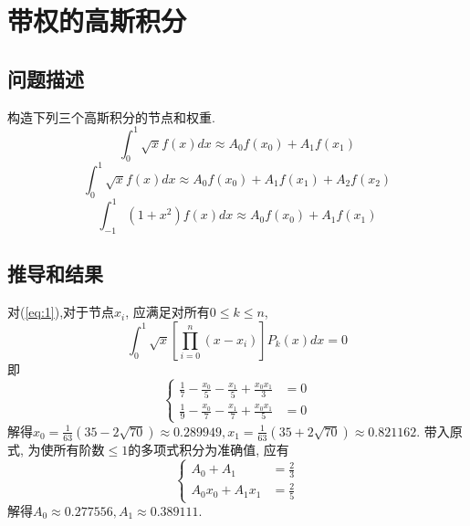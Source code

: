 \documentclass[UTF-8]{article}
\begin{document}
\section{带权的高斯积分}
\subsection{问题描述}
构造下列三个高斯积分的节点和权重.
\begin{equation}
	\int_{0}^{1} \sqrt{x} f(x) d x \approx A_{0} f\left(x_{0}\right)+A_{1} f\left(x_{1}\right)
	\label{eq:1}
\end{equation}
\begin{equation}
\int_{0}^{1} \sqrt{x} f(x) d x \approx A_{0} f\left(x_{0}\right)+A_{1} f\left(x_{1}\right)+A_{2} f\left(x_{2}\right)
\label{eq:2}
\end{equation}
\begin{equation}
\int_{-1}^{1}\left(1+x^{2}\right) f(x) d x \approx A_{0} f\left(x_{0}\right)+A_{1} f\left(x_{1}\right)
\label{eq:3}
\end{equation}
\subsection{推导和结果}
对(\ref{eq:1}),对于节点$x_i$, 应满足对所有$0\leqslant k\leqslant n$,
\begin{equation}
\label{eq:4}
	\int_{0}^{1}\sqrt{x}\left[ \prod_{i=0}^n(x-x_i)\right] P_{k}(x) d x=0
\end{equation}
即
\begin{equation}
	\left\lbrace
	\begin{split}
	\frac{1}{7}-\frac{x_0}{5}-\frac{x_1}{5}+\frac{x_0 x_1}{3}&=0\\
	\frac{1}{9}-\frac{x_0}{7}-\frac{x_1}{7}+\frac{x_0 x_1}{5}&=0
	\end{split}
	\right.
\end{equation}
解得$x_0=\frac{1}{63}(35-2 \sqrt{70})\approx 0.289949,  x_1=\frac{1}{63}(35+2 \sqrt{70})\approx 0.821162$. 带入原式, 为使所有阶数$\leqslant1$的多项式积分为准确值, 应有
\begin{equation}
	\left\lbrace
	\begin{split}
	A_0+A_1&=\frac{2}{3}\\
	A_0 x_0+A_1 x_1&=\frac{2}{5}
	\end{split}
	\right.
\end{equation}
解得$A_0\approx0.277556, A_1\approx0.389111$.
\end{document}
